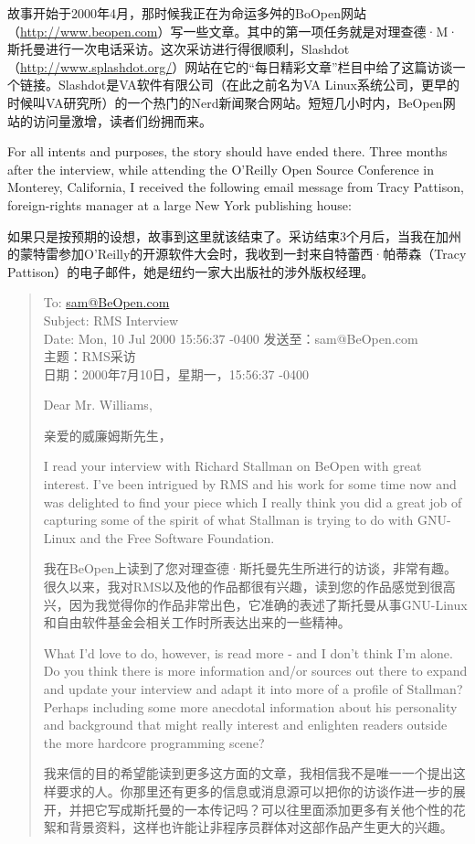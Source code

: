\ifdefined\chs
故事开始于2000年4月，那时候我正在为命运多舛的BoOpen网站（\url{http://www.beopen.com}）写一些文章。其中的第一项任务就是对理查德·M·斯托曼进行一次电话采访。这次采访进行得很顺利，Slashdot（\url{http://www.splashdot.org/}）网站在它的``每日精彩文章''栏目中给了这篇访谈一个链接。Slashdot是VA软件有限公司（在此之前名为VA Linux系统公司，更早的时候叫VA研究所）的一个热门的Nerd新闻聚合网站。短短几小时内，BeOpen网站的访问量激增，读者们纷拥而来。
\fi

\ifdefined\eng
For all intents and purposes, the story should have ended there. Three months after the interview, while attending the O'Reilly Open Source Conference in Monterey, California, I received the following email message from Tracy Pattison, foreign-rights manager at a large New York publishing house:
\fi

\ifdefined\chs
如果只是按预期的设想，故事到这里就该结束了。采访结束3个月后，当我在加州的蒙特雷参加O'Reilly的开源软件大会时，我收到一封来自特蕾西·帕蒂森（Tracy Pattison）的电子邮件，她是纽约一家大出版社的涉外版权经理。
\fi

\begin{quote}
\ifdefined\eng
To: \url{sam@BeOpen.com}\\Subject: RMS Interview\\Date: Mon, 10 Jul 2000 15:56:37 -0400
\fi
\ifdefined\chs
发送至：sam@BeOpen.com\\主题：RMS采访\\日期：2000年7月10日，星期一，15:56:37 -0400
\fi

\ifdefined\eng
Dear Mr. Williams,
\fi

\ifdefined\chs
亲爱的威廉姆斯先生，
\fi

\ifdefined\eng
I read your interview with Richard Stallman on BeOpen with great interest. I've been intrigued by RMS and his work for some time now and was delighted to find your piece which I really think you did a great job of capturing some of the spirit of what Stallman is trying to do with GNU-Linux and the Free Software Foundation.
\fi

\ifdefined\chs
我在BeOpen上读到了您对理查德·斯托曼先生所进行的访谈，非常有趣。很久以来，我对RMS以及他的作品都很有兴趣，读到您的作品感觉到很高兴，因为我觉得你的作品非常出色，它准确的表述了斯托曼从事GNU-Linux和自由软件基金会相关工作时所表达出来的一些精神。
\fi

\ifdefined\eng
What I'd love to do, however, is read more - and I don't think I'm alone. Do you think there is more information and/or sources out there to expand and update your interview and adapt it into more of a profile of Stallman? Perhaps including some more anecdotal information about his personality and background that might really interest and enlighten readers outside the more hardcore programming scene?
\fi

\ifdefined\chs
我来信的目的希望能读到更多这方面的文章，我相信我不是唯一一个提出这样要求的人。你那里还有更多的信息或消息源可以把你的访谈作进一步的展开，并把它写成斯托曼的一本传记吗？可以往里面添加更多有关他个性的花絮和背景资料，这样也许能让非程序员群体对这部作品产生更大的兴趣。
\fi
\end{quote}

